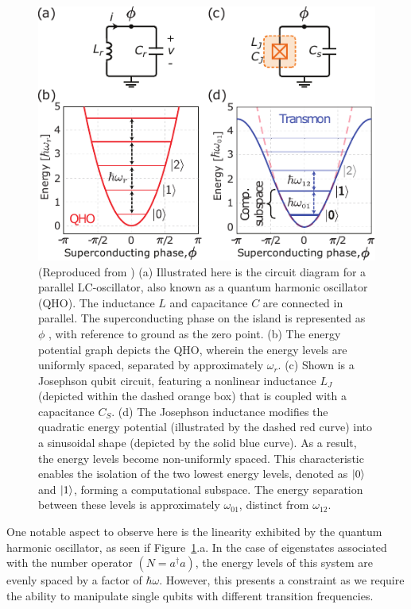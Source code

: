 \documentclass[
  journal=largetwo,
  year=2023,
]{cup-journal}
\begin{document}
\begin{figure}[t]
  \centering
  \includegraphics[width=0.75\linewidth]{figs/circuits.pdf}
  \caption{(Reproduced from \autocite{krantz_2019_a})
    (a) Illustrated here is the circuit diagram for a parallel LC-oscillator, also known as a quantum harmonic oscillator (QHO). The inductance \(L\) and capacitance \(C\) are connected in parallel. The superconducting phase on the island is represented as \( \phi \) , with reference to ground as the zero point.
    (b) The energy potential graph depicts the QHO, wherein the energy levels are uniformly spaced, separated by approximately \(\omega_r\).
    (c) Shown is a Josephson qubit circuit, featuring a nonlinear inductance \(L_J\)  (depicted within the dashed orange box) that is coupled with a capacitance \(C_S\).
    (d) The Josephson inductance modifies the quadratic energy potential (illustrated by the dashed red curve) into a sinusoidal shape (depicted by the solid blue curve). As a result, the energy levels become non-uniformly spaced. This characteristic enables the isolation of the two lowest energy levels, denoted as \(\ket{0}\) and \(\ket{1}\), forming a computational subspace. The energy separation between these levels is approximately \(\omega_{01}\), distinct from \(\omega_{12}\).}
  \label{fig:circuits}
\end{figure}

One notable aspect to observe here is the linearity exhibited by the quantum harmonic oscillator, as seen if Figure~\ref{fig:circuits}.a. In the case of eigenstates associated with the number operator \((N=a^\dagger a)\), the energy levels of this system are evenly spaced by a factor of \( \hbar\omega \). However, this presents a constraint as we require the ability to manipulate single qubits with different transition frequencies.
\end{document}
